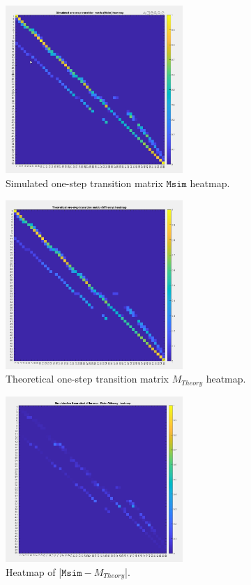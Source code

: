 \documentclass[12pt]{article}
\begin{document}
\begin{figure}[h!]
    \centering
    \includegraphics[width=0.6\textwidth]{media/1.jpg}
    \caption{Simulated one-step transition matrix $\texttt{Msim}$ heatmap.}
    \label{fig:myimage}
\end{figure}
\begin{figure}[h!]
    \centering
    \includegraphics[width=0.6\textwidth]{media/2.jpg}
    \caption{Theoretical one-step transition matrix $M_{Theory}$ heatmap.}
    \label{fig:myimage}
\end{figure}
\begin{figure}[h!]
    \centering
    \includegraphics[width=0.6\textwidth]{media/3.jpg}
    \caption{Heatmap of |$\texttt{Msim}-M_{Theory}$|.}
    \label{fig:myimage}
\end{figure}
\end{document}
